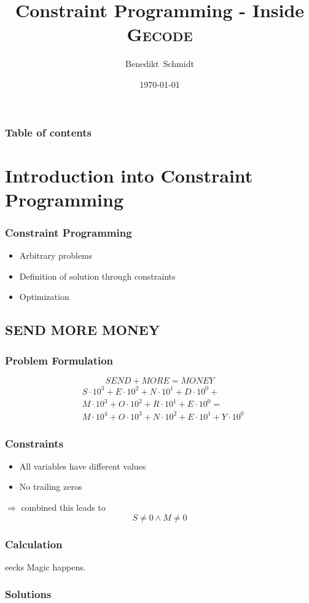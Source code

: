 \documentclass[hyperref={pdfpagelabels=false}]{beamer}
\title{Constraint Programming - Inside \textsc{Gecode}}
\author[Schmidt]{Benedikt~Schmidt}
\institute{Technische~Universit\"at~M\"unchen,~Germany}
\date{\today}
\begin{document}
\begin{frame}
\titlepage
\end{frame} 

\begin{frame}
\frametitle{Table of contents}
\tableofcontents
\end{frame} 

\section{Introduction into Constraint Programming}
\begin{frame}
	\frametitle{Constraint Programming}
	
	\begin{itemize}
		\item Arbitrary problems
		\item Definition of solution through constraints
		\item Optimization
	\end{itemize}
\end{frame}

\subsection{SEND MORE MONEY}
\begin{frame}
	\frametitle{Problem Formulation}
	
	\[SEND + MORE = MONEY\]
	\begin{equation}
	\begin{split}
		& S \cdot 10^3 + E \cdot 10^2 + N \cdot 10^1 + D \cdot 10^0 + \\ 
		& M \cdot 10^3 + O \cdot 10^2 + R \cdot 10^1 + E \cdot 10^0 = \\ 
		& M \cdot 10^4 + O \cdot 10^3 + N \cdot 10^2 + E \cdot 10^1 + Y \cdot 10^0
	\end{split}
	\end{equation}	
\end{frame}

\begin{frame}
	\frametitle{Constraints}
	
	\begin{itemize}
		\item All variables have different values
		\item No trailing zeros
	\end{itemize}
	
	$\Rightarrow$ combined this leads to
	\begin{equation}
		S \ne 0 \land M \ne 0
	\end{equation}
\end{frame}

\begin{frame}
	\frametitle{Calculation}
	
	\begin{beamercolorbox}[shadow=true, rounded=true]{eecks}
		\centering		
		\Large{Magic happens.}
	\end{beamercolorbox}
\end{frame}

\begin{frame}
	\frametitle{Solutions}
\end{frame}
\end{document}
